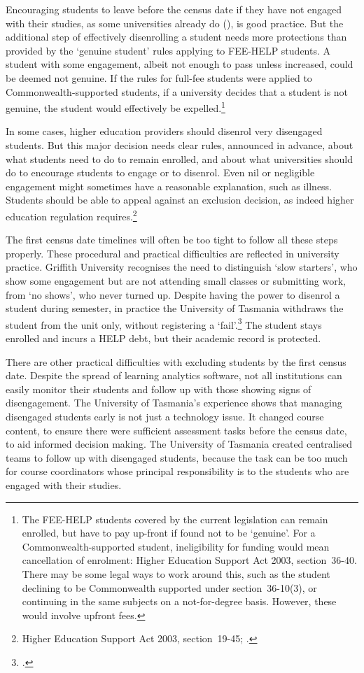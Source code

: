 Encouraging students to leave before the census date if they have not engaged with their studies, as some universities already do (), is good practice. But the additional step of effectively disenrolling a student needs more protections than provided by the `genuine student' rules applying to FEE-HELP students. A student with some engagement, albeit not enough to pass unless increased, could be deemed not genuine. If the rules for full-fee students were applied to Commonwealth-supported students, if a university decides that a student is not genuine, the student would effectively be expelled.\footnote{The FEE-HELP students covered by the current legislation can remain enrolled, but have to pay up-front if found not to be `genuine'. For a Commonwealth-supported student, ineligibility for funding would mean cancellation of enrolment: Higher Education Support Act 2003, section~36-40. There may be some legal ways to work around this, such as the student declining to be Commonwealth supported under section~36-10(3), or continuing in the same subjects on a not-for-degree basis. However, these would involve upfront fees.}

In some cases, higher education providers should disenrol very disengaged students. But this major decision needs clear rules, announced in advance, about what students need to do to remain enrolled, and about what universities should do to encourage students to engage or to disenrol. Even nil or negligible engagement might sometimes have a reasonable explanation, such as illness. Students should be able to appeal against an exclusion decision, as indeed higher education regulation requires.\footnote{Higher Education Support Act 2003, section~19-45; \textcite[][section~2.4]{DepartmentofEducationandTraining2015n}.}

The first census date timelines will often be too tight to follow all these steps properly. These procedural and practical difficulties are reflected in university practice. Griffith University recognises the need to distinguish `slow starters', who show some engagement but are not attending small classes or submitting work, from `no shows', who never turned up. Despite having the power to disenrol a student during semester, in practice the University of Tasmania withdraws the student from the unit only, without registering a `fail'.\footcite{Brown2017} The student stays enrolled and incurs a HELP debt, but their academic record is protected.

There are other practical difficulties with excluding students by the first census date. Despite the spread of learning analytics software, not all institutions can easily monitor their students and follow up with those showing signs of disengagement. The University of Tasmania's experience shows that managing disengaged students early is not just a technology issue. It changed course content, to ensure there were sufficient assessment tasks before the census date, to aid informed decision making. The University of Tasmania created centralised teams to follow up with disengaged students, because the task can be too much for course coordinators whose principal responsibility is to the students who are engaged with their studies.

